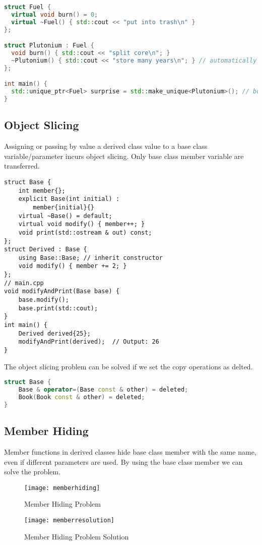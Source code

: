 \begin{lstlisting}[language=C++]
struct Fuel {
  virtual void burn() = 0;
  virtual ~Fuel() { std::cout << "put into trash\n" }
};

struct Plutonium : Fuel {
  void burn() { std::cout << "split core\n"; }
  ~Plutonium() { std::cout << "store many years\n"; } // automatically inherits virtual
};

int main() {
  std::unique_ptr<Fuel> surprise = std::make_unique<Plutonium>(); // both called
}
\end{lstlisting}

\subsection{Object Slicing}
Assigning or passing by value a derived class value to a base class variable/parameter incurs object slicing. Only base class member variable are transferred.

\begin{lstlisting}
struct Base {
	int member{};
	explicit Base(int initial) :
		member{initial}{} 
	virtual ~Base() = default;
	virtual void modify() { member++; } 
	void print(std::ostream & out) const;
};
struct Derived : Base {
	using Base::Base; // inherit constructor
	void modify() { member += 2; }
};
// main.cpp
void modifyAndPrint(Base base) {
	base.modify();
	base.print(std::cout); 
}
int main() {
	Derived derived{25};
	modifyAndPrint(derived);  // Output: 26
}
\end{lstlisting}


The object slicing problem can be solved if we set the copy operations as delted.
\begin{lstlisting}[language=C++]
struct Base {
	Base & operator=(Base const & other) = deleted;
	Book(Book const & other) = deleted;
}
\end{lstlisting}

\subsection{Member Hiding}
Member functions in derived classes hide base class member with the same name, even if different parameters are used. By using the base class member we can solve the problem.

\begin{figure}[h!]
  \center
  \texttt{[image: memberhiding]}
  \caption{Member Hiding Problem}
\end{figure}

\begin{figure}[h!]
  \center
  \texttt{[image: memberresolution]}
  \caption{Member Hiding Problem Solution}
\end{figure}







